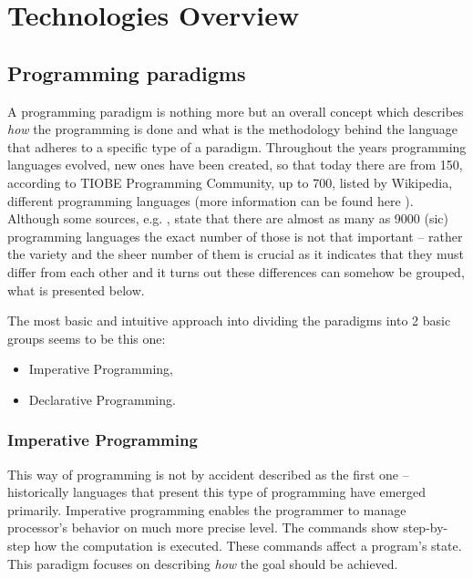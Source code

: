 \section{Technologies Overview}
    \subsection{Programming paradigms}
        A programming paradigm is nothing more but an overall concept which describes \textit{how} the programming is done and what is the methodology behind the language that adheres to a specific type of a paradigm. Throughout the years programming languages evolved, new ones have been created, so that today there are from 150, according to TIOBE Programming Community, up to 700, listed by Wikipedia, different programming languages (more information can be found here \cite{numberOfProgrammingLanguages}). Although some sources, e.g. \cite{numberOfProgrammingLanguages_hopl_info}, state that there are almost as many as 9000 (sic) programming languages the exact number of those is not that important -- rather the variety and the sheer number of them is crucial as it indicates that they must differ from each other and it turns out these differences can somehow be grouped, what is presented below.
        
        The most basic and intuitive approach into dividing the paradigms into 2 basic groups seems to be this one:
        \begin{itemize}
            \item Imperative Programming,
            \item Declarative Programming.
        \end{itemize}
    
    \subsubsection{Imperative Programming}
        This way of programming is not by accident described as the first one -- historically languages that present this type of programming have emerged primarily. Imperative programming enables the programmer to manage processor's behavior on much more precise level. The commands show step-by-step how the computation is executed. These commands affect a program's state. This paradigm focuses on describing \textit{how} the goal should be achieved.
        
